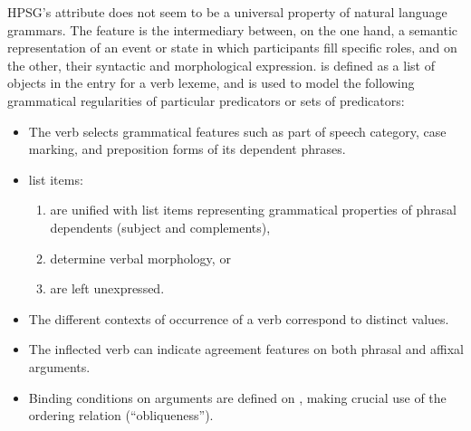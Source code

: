 \documentclass[output=paper
	        ,collection
	        ,collectionchapter
 	        ,biblatex
                ,babelshorthands
                ,newtxmath
                ,draftmode
                ,colorlinks, citecolor=brown
]{langscibook}
\begin{document}

HPSG's \argst attribute does not seem to be a universal property of natural
language grammars.  The \argst feature is the intermediary between, on
the one hand, a semantic representation of an event or state in which
participants fill specific roles, and on the other, their syntactic and
morphological expression.  \argst is defined as a list of 
objects in the entry for a verb lexeme, and is used to model the following grammatical regularities of particular predicators or sets of predicators:

\begin{itemize}
\item The verb selects grammatical features such as part of speech
category, case marking, and preposition forms of its dependent
phrases.
\item \argst list items:
\begin{enumerate}
\item are unified with \val list items
representing grammatical properties of phrasal dependents (subject and
complements),
\item determine verbal morphology, or
\item are left unexpressed.
\end{enumerate}
\item The different contexts of occurrence of a verb correspond to distinct \argst values.
\item The inflected verb can indicate agreement features on both phrasal
and affixal arguments.
\item Binding conditions on arguments are defined on \argst, making
crucial use of the ordering relation (``obliqueness'').
\end{itemize}
\end{document}
